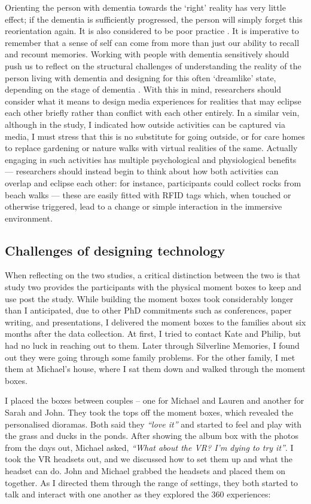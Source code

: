 Orienting the person with dementia towards the `right' reality has very little effect; if the dementia is sufficiently progressed, the person will simply forget this reorientation again. It is also considered to be poor practice \citep{cipriani_understanding_2014}. It is imperative to remember that a sense of self can come from more than just our ability to recall and recount memories. Working with people with dementia sensitively should push us to reflect on the structural challenges of understanding the reality of the person living with dementia and designing for this often `dreamlike' state, depending on the stage of dementia \citep{bryden_before_2015}. With this in mind, researchers should consider what it means to design media experiences for realities that may eclipse each other briefly rather than conflict with each other entirely. In a similar vein,  although in the study, I indicated how outside activities can be captured via media, I must stress that this is no substitute for going outside, or for care homes to replace gardening or nature walks with virtual realities of the same. Actually engaging in such activities has multiple psychological and physiological benefits \citep{gilliard_transforming_2011} — researchers should instead begin to think about how both activities can overlap and eclipse each other: for instance, participants could collect rocks from beach walks — these are easily fitted with RFID tags which, when touched or otherwise triggered, lead to a change or simple interaction in the immersive environment.

\subsection{Challenges of designing technology}
\label{robust-tech}
When reflecting on the two studies, a critical distinction between the two is that study two provides the participants with the physical moment boxes to keep and use post the study. While building the moment boxes took considerably longer than I anticipated, due to other PhD commitments such as conferences, paper writing, and presentations, I delivered the moment boxes to the families about six months after the data collection. At first, I tried to contact Kate and Philip, but had no luck in reaching out to them. Later through Silverline Memories, I found out they were going through some family problems. For the other family, I met them at Michael's house, where I sat them down and walked through the moment boxes.

I placed the boxes between couples – one for Michael and Lauren and another for Sarah and John. They took the tops off the moment boxes, which revealed the personalised dioramas. Both said they \textit{``love it''} and started to feel and play with the grass and ducks in the ponds. After showing the album box with the photos from the days out, Michael asked, \textit{``What about the VR? I'm dying to try it''}. I took the VR headsets out, and we discussed how to set them up and what the headset can do. John and Michael grabbed the headsets and placed them on together. As I directed them through the range of settings, they both started to talk and interact with one another as they explored the 360 experiences:

